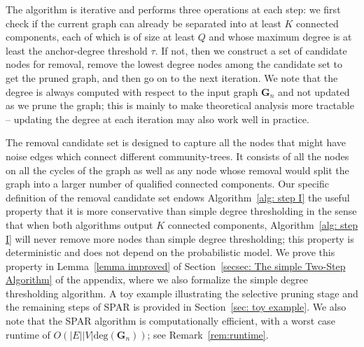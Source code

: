 \documentclass[twoside,11pt]{article}
\theoremstyle{remark}
\begin{document}
The algorithm is iterative and performs three operations at each step: we first check if the current graph can already be separated into at least $K$ connected components, each of which is of size at least $Q$ and whose maximum degree is at least the anchor-degree threshold $\tau$. If not, then we construct a set of candidate nodes for removal, remove the lowest degree nodes among the candidate set to get the pruned graph, and then go on to the next iteration. We note that the degree is always computed with respect to the input graph $\bm{G}_n$ and not updated as we prune the graph; this is mainly to make theoretical analysis more tractable -- updating the degree at each iteration may also work well in practice. 

The removal candidate set is designed to capture all the nodes that might have noise edges which connect different community-trees. It consists of all the nodes on all the cycles of the graph as well as any node whose removal would split the graph into a larger number of qualified connected components. Our specific definition of the removal candidate set endows Algorithm~\ref{alg: step I} the useful property that it is more conservative than simple degree thresholding in the sense that when both algorithms output $K$ connected components, Algorithm~\ref{alg: step I} will never remove more nodes than simple degree thresholding; this property is deterministic and does not depend on the probabilistic model. We prove this property in Lemma~\ref{lemma improved} of Section~\ref{secsec: The simple Two-Step Algorithm} of the appendix, where we also formalize the simple degree thresholding algorithm. A toy example illustrating the selective pruning stage and the remaining steps of SPAR is provided in Section~\ref{sec: toy example}. We also note that the SPAR algorithm is computationally efficient, with a worst case runtime of $O(|E||V| \text{deg}(\bm{G}_n))$; see Remark~\ref{rem:runtime}. 



\end{document}
